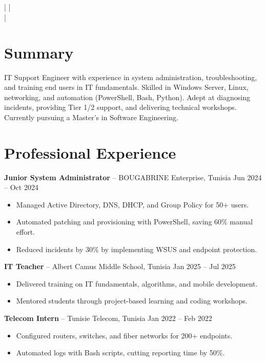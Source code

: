 \documentclass[a4paper,10pt]{article}
\begin{document}
\begin{center}
    {\LARGE \textbf{\FullName}} \\
    \JobTitle \\
    \Phone \;|\; \href{mailto:\Email}{\Email} \;|\; \Location \\
    \LinkedIn \;|\; \GitHub
\end{center}

\section*{Summary}
IT Support Engineer with experience in system administration, troubleshooting, and training end users in IT fundamentals. Skilled in Windows Server, Linux, networking, and automation (PowerShell, Bash, Python). Adept at diagnosing incidents, providing Tier 1/2 support, and delivering technical workshops. Currently pursuing a Master’s in Software Engineering.

\section*{Professional Experience}
\textbf{Junior System Administrator} – BOUGABRINE Enterprise, Tunisia \hfill Jun 2024 -- Oct 2024
\begin{itemize}
    \item Managed Active Directory, DNS, DHCP, and Group Policy for 50+ users.
    \item Automated patching and provisioning with PowerShell, saving 60\% manual effort.
    \item Reduced incidents by 30\% by implementing WSUS and endpoint protection.
\end{itemize}

\textbf{IT Teacher} – Albert Camus Middle School, Tunisia \hfill Jan 2025 -- Jul 2025
\begin{itemize}
    \item Delivered training on IT fundamentals, algorithms, and mobile development.
    \item Mentored students through project-based learning and coding workshops.
\end{itemize}

\textbf{Telecom Intern} – Tunisie Telecom, Tunisia \hfill Jan 2022 -- Feb 2022
\begin{itemize}
    \item Configured routers, switches, and fiber networks for 200+ endpoints.
    \item Automated logs with Bash scripts, cutting reporting time by 50\%.
\end{itemize}
\end{document}
